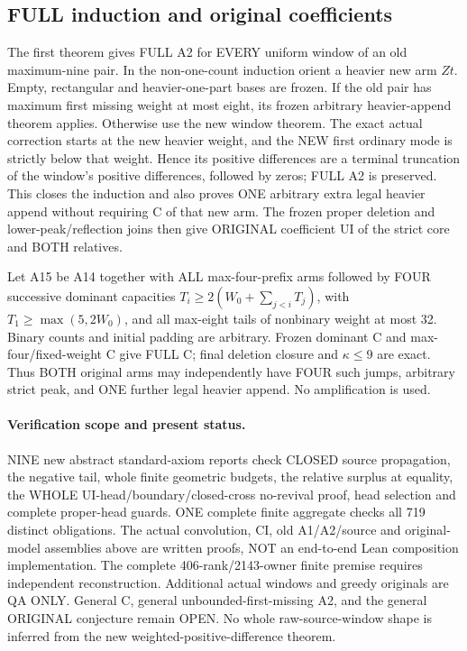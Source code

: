 \subsection{FULL induction and original coefficients}
The first theorem gives FULL A2 for EVERY uniform window of an old
maximum-nine pair. In the non-one-count induction orient a heavier
new arm $Zt$. Empty, rectangular and heavier-one-part bases are frozen.
If the old pair has maximum first missing weight at most eight, its
frozen arbitrary heavier-append theorem applies. Otherwise use the new
window theorem. The exact actual correction starts at the new heavier
weight, and the NEW first ordinary mode is strictly below that weight.
Hence its positive differences are a terminal truncation of the window's
positive differences, followed by zeros; FULL A2 is preserved.
This closes the induction and also proves ONE arbitrary extra legal
heavier append without requiring C of that new arm. The frozen proper
deletion and lower-peak/reflection joins then give ORIGINAL coefficient
UI of the strict core and BOTH relatives.

Let A15 be A14 together with ALL max-four-prefix arms followed by FOUR
successive dominant capacities $T_i\ge2(W_0+\sum_{j<i}T_j)$, with
$T_1\ge\max(5,2W_0)$, and all max-eight tails of nonbinary weight at
most 32. Binary counts and initial padding are arbitrary. Frozen
dominant C and max-four/fixed-weight C give FULL C; final deletion
closure and $\kappa\le9$ are exact. Thus BOTH original arms may
independently have FOUR such jumps, arbitrary strict peak, and ONE
further legal heavier append. No amplification is used.

\paragraph{Verification scope and present status.}
NINE new abstract standard-axiom reports check CLOSED source propagation,
the negative tail, whole finite geometric budgets, the relative surplus
at equality, the WHOLE UI-head/boundary/closed-cross no-revival proof,
head selection and complete proper-head guards. ONE complete finite
aggregate checks all 719 distinct obligations. The actual convolution,
CI, old A1/A2/source and original-model assemblies above are written
proofs, NOT an end-to-end Lean composition implementation. The complete
406-rank/2143-owner finite premise requires independent reconstruction.
Additional actual windows and greedy originals are QA ONLY. General C,
general unbounded-first-missing A2, and the general ORIGINAL conjecture
remain OPEN. No whole raw-source-window shape is inferred from the
new weighted-positive-difference theorem.
